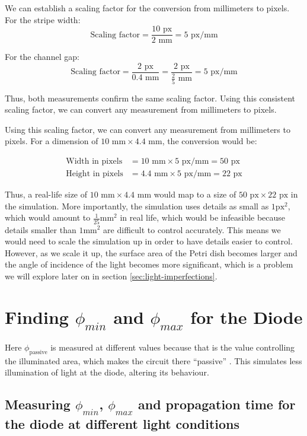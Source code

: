 We can establish a scaling factor for the conversion from millimeters to pixels.
For the stripe width:
\[ \text{Scaling factor} = \frac{10 \text{ px}}{2 \text{ mm}} = 5 \text{ px/mm} \]

For the channel gap:
\[ \text{Scaling factor} = \frac{2 \text{ px}}{0.4 \text{ mm}} = \frac{2 \text{ px}}{\frac{2}{5} \text{ mm}} = 5 \text{ px/mm} \]

Thus, both measurements confirm the same scaling factor. Using this consistent scaling factor, we can convert any measurement from millimeters to pixels.

Using this scaling factor, we can convert any measurement from millimeters to pixels.
For a dimension of \(10 \text{ mm} \times 4.4 \text{ mm}\), the conversion would be:

\begin{align*}
\text{Width in pixels} &= 10 \text{ mm} \times 5 \text{ px/mm} = 50 \text{ px} \\
\text{Height in pixels} &= 4.4 \text{ mm} \times 5 \text{ px/mm} = 22 \text{ px}
\end{align*}

Thus, a real-life size of \(10 \text{ mm} \times 4.4 \text{ mm}\) would map to a size of \(50 \text{ px} \times 22 \text{ px}\) in the simulation.
More importantly, the simulation uses details as small as $1\text{px}^2$, which would amount to $\frac{1}{25}\text{mm}^2$ in real life, which would be infeasible because details smaller than $1\text{mm}^2$ are difficult to control accurately.
This means we would need to scale the simulation up in order to have details easier to control. 
However, as we scale it up, the surface area of the Petri dish becomes larger and the angle of incidence of the light becomes more significant, which is a problem we will explore later on in section \ref{sec:light-imperfections}.


\section{Finding $\phi_{min}$ and $\phi_{max}$ for the Diode}
Here $\phi_{\text{passive}}$ is measured at different values because that is the value controlling the illuminated area, which makes the circuit there ``passive'' . This simulates less illumination of light at the diode, altering its behaviour.
\subsection{Measuring $\phi_{min}$, $\phi_{max}$ and propagation time for the diode at different light conditions}


